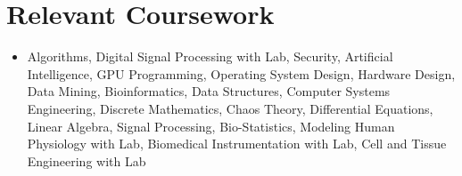 \documentclass[letterpaper,10pt]{article}
\newcommand{\resumeItemNoHeading}[1]{
  \item\small{
    {#1\vspace{-2pt}}
  }
}
\newcommand{\resumeSubHeadingListStart}{\begin{itemize}[leftmargin=*]}
\newcommand{\resumeSubHeadingListEnd}{\end{itemize}}
\begin{document}
  \section{Relevant Coursework}
  \resumeSubHeadingListStart
    \resumeItemNoHeading{
    {Algorithms, Digital Signal Processing with Lab, Security, Artificial Intelligence, GPU Programming, Operating System Design, Hardware Design, Data Mining, Bioinformatics, Data Structures, Computer Systems Engineering, Discrete Mathematics, Chaos Theory, Differential Equations, Linear Algebra, Signal Processing, Bio-Statistics, Modeling Human Physiology with Lab, Biomedical Instrumentation with Lab, Cell and Tissue Engineering with Lab}
    }
   \resumeSubHeadingListEnd
    

 


\end{document}
